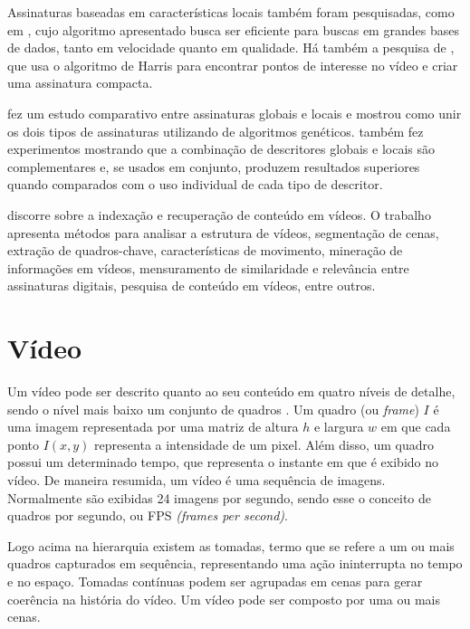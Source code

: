 Assinaturas baseadas em características locais também foram pesquisadas, como em \cite{joly2007content}, cujo algoritmo apresentado busca ser eficiente para buscas em grandes bases de dados, tanto em velocidade quanto em qualidade. Há também a  pesquisa de , que usa o algoritmo de Harris para encontrar pontos de interesse no vídeo e criar uma assinatura compacta.

 fez um estudo comparativo entre assinaturas globais e locais e mostrou como unir os dois tipos de assinaturas utilizando de algoritmos genéticos.  também fez experimentos mostrando que a combinação de descritores globais e locais são complementares e, se usados em conjunto, produzem resultados superiores quando comparados com o uso individual de cada tipo de descritor.

 discorre sobre a indexação e recuperação de conteúdo em vídeos. O trabalho apresenta métodos para analisar a estrutura de vídeos, segmentação de cenas, extração de quadros-chave, características de movimento, mineração de informações em vídeos, mensuramento de similaridade e relevância entre assinaturas digitais, pesquisa de conteúdo em vídeos, entre outros.


\section{Vídeo}
\label{sec:video}  

	Um vídeo pode ser descrito quanto ao seu conteúdo em quatro níveis de detalhe, sendo o nível mais baixo um conjunto de quadros \cite{lienhart1997video}. Um quadro (ou \textit{frame}) $I$ é uma imagem representada por uma matriz de altura $h$ e largura $w$ em que cada ponto $I(x,y)$ representa a intensidade de um pixel. Além disso, um quadro possui um determinado tempo, que representa o instante em que é exibido no vídeo. De maneira resumida, um vídeo é uma sequência de imagens. Normalmente são exibidas 24 imagens por segundo, sendo esse o conceito de quadros por segundo, ou FPS \textit{(frames per second)}. 

	Logo acima na hierarquia existem as tomadas, termo que se refere a um ou mais quadros capturados em sequência, representando uma ação ininterrupta no tempo e no espaço. Tomadas contínuas podem ser agrupadas em cenas para gerar coerência na história do vídeo. Um vídeo pode ser composto por uma ou mais cenas.

